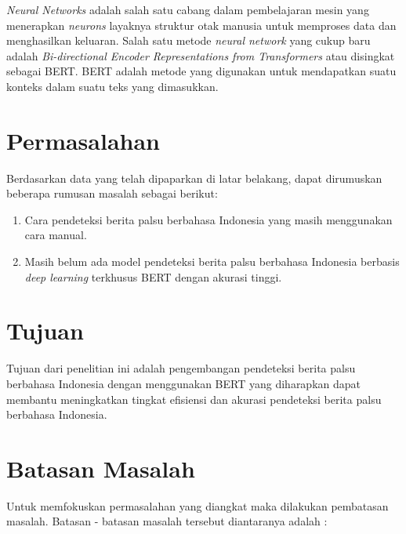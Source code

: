 \textit{Neural Networks} adalah salah satu cabang dalam pembelajaran mesin yang menerapkan \textit{neurons} layaknya struktur otak manusia untuk memproses data dan menghasilkan keluaran. Salah satu metode \textit{neural network} yang cukup baru adalah \textit{Bi-directional Encoder Representations from Transformers} atau disingkat sebagai BERT. BERT adalah metode yang digunakan untuk mendapatkan suatu konteks dalam suatu teks yang dimasukkan.

\section{Permasalahan}
\label{sec:permasalahan}

Berdasarkan data yang telah dipaparkan di latar belakang, dapat dirumuskan beberapa rumusan masalah sebagai berikut:

\begin{enumerate}[itemsep=-0.2em]
      \item Cara pendeteksi berita palsu berbahasa Indonesia yang masih menggunakan cara manual.

      \item Masih belum ada model pendeteksi berita palsu berbahasa Indonesia berbasis \textit{deep learning} terkhusus BERT dengan akurasi tinggi.

\end{enumerate}

\section{Tujuan}
\label{sec:Tujuan}

Tujuan dari penelitian ini adalah pengembangan pendeteksi berita palsu berbahasa Indonesia dengan menggunakan BERT yang diharapkan dapat membantu meningkatkan tingkat efisiensi dan akurasi pendeteksi berita palsu berbahasa Indonesia.

\section{Batasan Masalah}
\label{sec:batasanmasalah}

Untuk memfokuskan permasalahan yang diangkat maka dilakukan pembatasan masalah. Batasan - batasan masalah tersebut diantaranya adalah :

